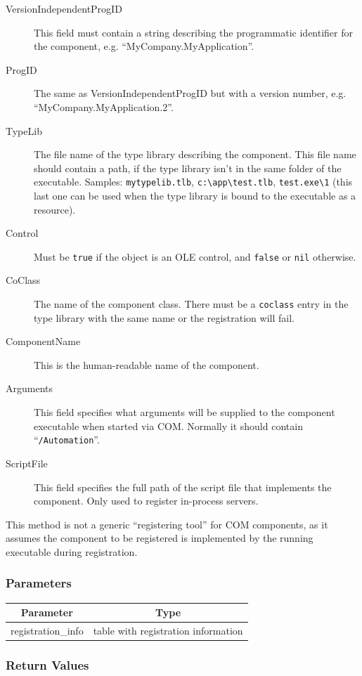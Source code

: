 \documentclass[11pt,a4paper,english]{report}
\begin{document}
\begin{description}
\item [VersionIndependentProgID] This field must contain a string
describing the programmatic identifier for the component,
e.g. ``MyCompany.MyApplication''.
\item [ProgID] The same as VersionIndependentProgID but with a version
number, e.g. ``MyCompany.MyApplication.2''.
\item [TypeLib] The file name of the type library describing the
component. This file name should contain a path, if the type library
isn't in the same folder of the executable. Samples:
\verb+mytypelib.tlb+, \verb+c:\app\test.tlb+, \verb+test.exe\1+ (this
last one can be used when the type library is bound to the executable
as a resource).
\item [Control] Must be \verb+true+ if the object is an OLE control,
and \verb+false+ or \verb+nil+ otherwise.
\item [CoClass] The name of the component class. There must be a
\texttt{coclass} entry in the type library with the same name or the
registration will fail.
\item [ComponentName] This is the human-readable name of the
component.
\item [Arguments] This field specifies what arguments will be supplied
to the component executable when started via COM. Normally it should
contain ``\texttt{/Automation}''.
\item [ScriptFile] This field specifies the full path of the script
  file that implements the component. Only used to register in-process
  servers.
\end{description}

This method is not a generic ``registering tool'' for COM
components, as it assumes the component to be registered is
implemented by the running executable during registration.

\subsubsection*{Parameters}

\begin{tabular}{|c|c|}
\hline
\bf Parameter & \bf Type  \\ \hline \hline
registration\_info & table with registration information  \\ \hline
\end{tabular}

\subsubsection*{Return Values}
\end{document}

